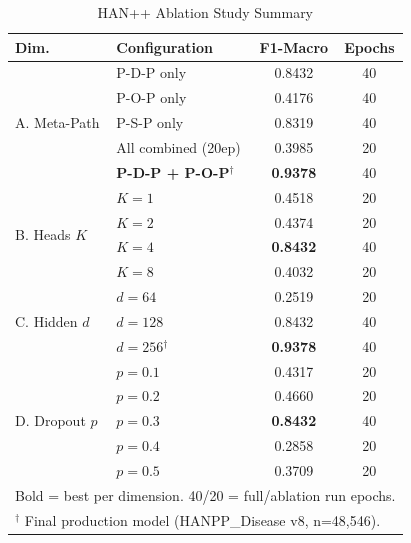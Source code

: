 \documentclass[conference]{IEEEtran}
\begin{document}
\begin{table}[h]
  \caption{HAN++ Ablation Study Summary}
  \label{tab:ablation}
  \centering
  \begin{tabular}{llcc}
    \toprule
    \textbf{Dim.} & \textbf{Configuration} &
    \textbf{F1-Macro} & \textbf{Epochs} \\
    \midrule
    \multirow{5}{*}{A. Meta-Path}
      & P-D-P only        & 0.8432          & 40 \\
      & P-O-P only        & 0.4176          & 40 \\
      & P-S-P only        & 0.8319          & 40 \\
      & All combined (20ep)& 0.3985         & 20 \\
      & \textbf{P-D-P + P-O-P}$^\dagger$ & \textbf{0.9378} & 40 \\
    \midrule
    \multirow{4}{*}{B. Heads $K$}
      & $K = 1$           & 0.4518          & 20 \\
      & $K = 2$           & 0.4374          & 20 \\
      & $K = 4$           & \textbf{0.8432} & 40 \\
      & $K = 8$           & 0.4032          & 20 \\
    \midrule
    \multirow{3}{*}{C. Hidden $d$}
      & $d = 64$          & 0.2519          & 20 \\
      & $d = 128$         & 0.8432          & 40 \\
      & \textbf{$d = 256$}$^\dagger$ & \textbf{0.9378} & 40 \\
    \midrule
    \multirow{5}{*}{D. Dropout $p$}
      & $p = 0.1$         & 0.4317          & 20 \\
      & $p = 0.2$         & 0.4660          & 20 \\
      & $p = 0.3$         & \textbf{0.8432} & 40 \\
      & $p = 0.4$         & 0.2858          & 20 \\
      & $p = 0.5$         & 0.3709          & 20 \\
    \bottomrule
    \multicolumn{4}{l}{\small Bold = best per dimension.
                              40/20 = full/ablation run epochs.} \\
    \multicolumn{4}{l}{\small $^\dagger$ Final production model
                              (HANPP\_Disease v8, n=48,546).} \\
  \end{tabular}
\end{table}
\end{document}
